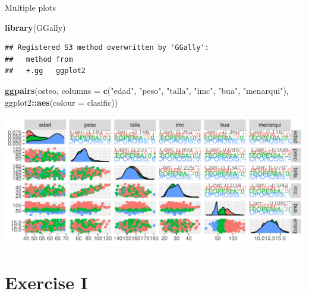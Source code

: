 \documentclass[
  ignorenonframetext,
]{beamer}
\newenvironment{Shaded}{\begin{snugshade}}{\end{snugshade}}
\newcommand{\AttributeTok}[1]{\textcolor[rgb]{0.13,0.29,0.53}{#1}}
\newcommand{\FunctionTok}[1]{\textcolor[rgb]{0.13,0.29,0.53}{\textbf{#1}}}
\newcommand{\NormalTok}[1]{#1}
\newcommand{\SpecialCharTok}[1]{\textcolor[rgb]{0.81,0.36,0.00}{\textbf{#1}}}
\newcommand{\StringTok}[1]{\textcolor[rgb]{0.31,0.60,0.02}{#1}}
\begin{document}
\begin{frame}[fragile]{Multiple plots}
\label{multiple-plots}
\begin{Shaded}
\begin{Highlighting}[]
\FunctionTok{library}\NormalTok{(GGally)}
\end{Highlighting}
\end{Shaded}

\begin{verbatim}
## Registered S3 method overwritten by 'GGally':
##   method from   
##   +.gg   ggplot2
\end{verbatim}

\begin{Shaded}
\begin{Highlighting}[]
\FunctionTok{ggpairs}\NormalTok{(osteo, }\AttributeTok{columns =} \FunctionTok{c}\NormalTok{(}\StringTok{"edad"}\NormalTok{, }\StringTok{"peso"}\NormalTok{, }\StringTok{"talla"}\NormalTok{, }\StringTok{"imc"}\NormalTok{, }\StringTok{"bua"}\NormalTok{, }\StringTok{"menarqui"}\NormalTok{), }
\NormalTok{        ggplot2}\SpecialCharTok{::}\FunctionTok{aes}\NormalTok{(}\AttributeTok{colour =}\NormalTok{ clasific))}
\end{Highlighting}
\end{Shaded}

\includegraphics{StatisticsWithR-3-Exploratory_Analysis_II_And_Graphics_files/figure-beamer/unnamed-chunk-19-1.pdf}
\end{frame}

\section{Exercise I}\label{exercise-i}
\end{document}

